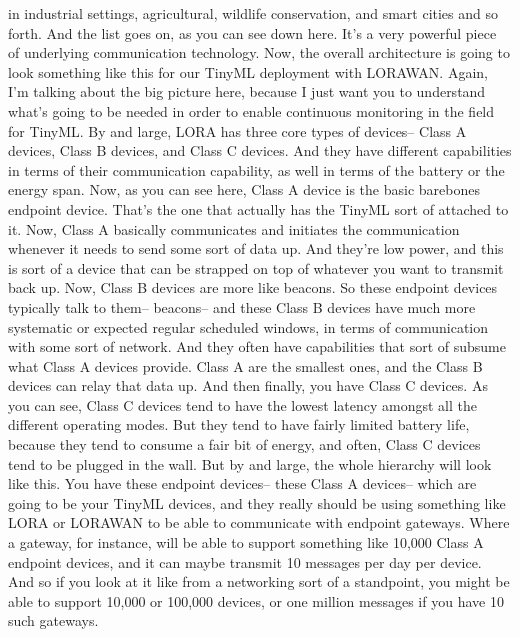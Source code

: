 {{{{{{{{    in industrial settings, agricultural, wildlife conservation, and smart cities
    and so forth.
    And the list goes on, as you can see down here.
    It's a very powerful piece of underlying communication technology.
    Now, the overall architecture is going to look something like this
    for our TinyML deployment with LORAWAN.
    Again, I'm talking about the big picture here,
    because I just want you to understand what's
    going to be needed in order to enable continuous monitoring
    in the field for TinyML.
    By and large, LORA has three core types of devices--
    Class A devices, Class B devices, and Class C devices.
    And they have different capabilities in terms of their communication
    capability, as well in terms of the battery or the energy span.
    Now, as you can see here, Class A device is the basic barebones endpoint device.
    That's the one that actually has the TinyML sort of attached to it.
    Now, Class A basically communicates and initiates
    the communication whenever it needs to send some sort of data up.
    And they're low power, and this is sort of a device that
    can be strapped on top of whatever you want to transmit back up.
    Now, Class B devices are more like beacons.
    So these endpoint devices typically talk to them-- beacons-- and these Class B
    devices have much more systematic or expected
    regular scheduled windows, in terms of communication
    with some sort of network.
    And they often have capabilities that sort of subsume
    what Class A devices provide.
    Class A are the smallest ones, and the Class B devices can relay that data up.
    And then finally, you have Class C devices.
    As you can see, Class C devices tend to have the lowest latency amongst
    all the different operating modes.
    But they tend to have fairly limited battery life,
    because they tend to consume a fair bit of energy,
    and often, Class C devices tend to be plugged in the wall.
    But by and large, the whole hierarchy will look like this.
    You have these endpoint devices--
    these Class A devices-- which are going to be your TinyML devices,
    and they really should be using something like LORA or LORAWAN
    to be able to communicate with endpoint gateways.
    Where a gateway, for instance, will be able to support something like 10,000
    Class A endpoint devices, and it can maybe
    transmit 10 messages per day per device.
    And so if you look at it like from a networking sort of a standpoint,
    you might be able to support 10,000 or 100,000 devices, or one million
    messages if you have 10 such gateways.
}}}}}}}}
